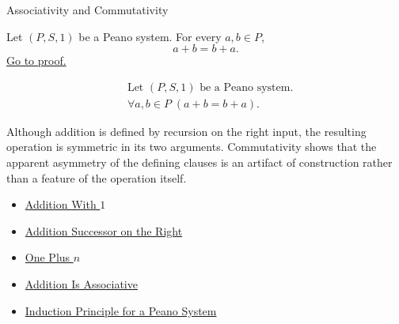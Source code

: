 \begin{topicbox}{Associativity and Commutativity}
\begin{tcolorbox}[colback=thmbox, colframe=thmborder, arc=2pt,
  left=6pt, right=6pt, top=4pt, bottom=4pt,
  title={\small\textbf{Theorem (Addition Is Commutative)}},
  fonttitle=\small\bfseries]
\begin{theorem}
\label{thm:addition-commutative}
Let $(P,S,1)$ be a Peano system. For every $a,b \in P$,
\[
a+b=b+a.
\]
\hyperref[prf:addition-commutative]{Go to proof.}
\end{theorem}
\end{tcolorbox}

\begin{remark*}
\[
\begin{aligned}
&\text{Let } (P,S,1) \text{ be a Peano system.}\\
&\forall a,b \in P\;(a+b=b+a).
\end{aligned}
\]
\end{remark*}

\begin{remark*}[Interpretation]
Although addition is defined by recursion on the right input, the resulting
operation is symmetric in its two arguments. Commutativity shows that the
apparent asymmetry of the defining clauses is an artifact of construction
rather than a feature of the operation itself.
\end{remark*}

\begin{dependencies}
\begin{itemize}
  \item \hyperref[thm:addition-with-one]{Addition With $1$}
  \item \hyperref[thm:addition-successor-on-right]{Addition Successor on the Right}
  \item \hyperref[thm:one-plus-n]{One Plus $n$}
  \item \hyperref[thm:addition-associative]{Addition Is Associative}
  \item \hyperref[thm:induction-principle-for-peano-system]{Induction Principle for a Peano System}
\end{itemize}
\end{dependencies}
\end{topicbox}

